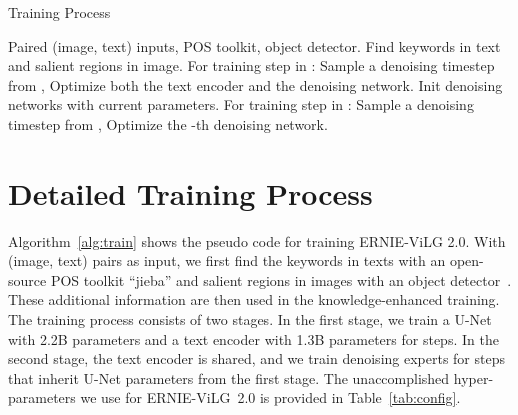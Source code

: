 \documentclass[10pt,twocolumn,letterpaper]{article}
\begin{document}
\newpage

\appendix










\begin{algorithm}[t]
\footnotesize
\caption{Training Process}\label{alg:train}
\begin{algorithmic}[1]
\Require Paired (image, text) inputs, POS toolkit, object detector.
\State Find keywords in text and salient regions in image. 
\State For training step  in : 
\State \quad Sample a denoising timestep  from ,
\State \quad Optimize both the text encoder and the denoising network.
\State Init  denoising networks with current parameters.
\State For training step  in : 
\State \quad Sample a denoising timestep  from ,
\State \quad Optimize the -th denoising network.
\end{algorithmic}
\end{algorithm}


\section{Detailed Training Process}\label{sec:training}

Algorithm~\ref{alg:train} shows the pseudo code for training ERNIE-ViLG 2.0.
With (image, text) pairs as input, we first find the keywords in texts with an open-source POS toolkit ``jieba'' and salient regions in images with an object detector~\cite{DBLP:conf/cvpr/00010BT0GZ18}. These additional information are then used in the knowledge-enhanced training.
The training process consists of two stages. In the first stage, we train a U-Net with 2.2B parameters and a text encoder with 1.3B parameters for  steps. In the second stage, the text encoder is shared, and we train  denoising experts for  steps that inherit U-Net parameters from the first stage.
The unaccomplished hyper-parameters we use for ERNIE-ViLG~2.0 is provided in Table~\ref{tab:config}.
\end{document}
